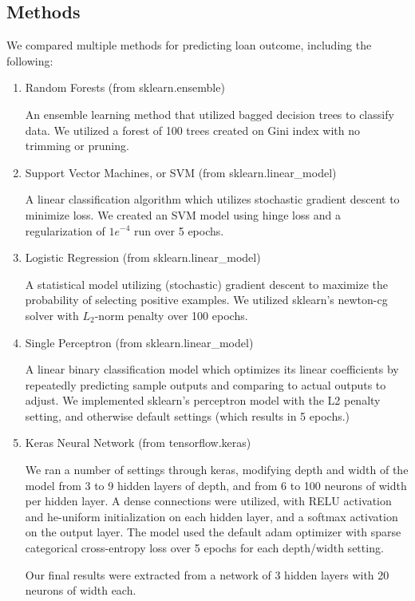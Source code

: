 \subsection{Methods}

We compared multiple methods for predicting loan outcome, including the following:

\begin{enumerate}
    \item Random Forests (from sklearn.ensemble)

        An ensemble learning method that utilized bagged decision trees to classify data. We utilized a forest of 100 trees created on Gini index with no trimming or pruning.
    
    \item Support Vector Machines, or SVM (from sklearn.linear\_model)

        A linear classification algorithm which utilizes stochastic gradient descent to minimize loss. We created an SVM model using hinge loss and a regularization of $1 e^{-4}$ run over 5 epochs.

    \item Logistic Regression (from sklearn.linear\_model)

        A statistical model utilizing (stochastic) gradient descent to maximize the probability of selecting positive examples. We utilized sklearn's newton-cg solver with $L_2$-norm penalty over 100 epochs.

    \item Single Perceptron (from sklearn.linear\_model)

        A linear binary classification model which optimizes its linear coefficients by repeatedly predicting sample outputs and comparing to actual outputs to adjust. We implemented sklearn's perceptron model with the L2 penalty setting, and otherwise default settings (which results in 5 epochs.)

    \item Keras Neural Network (from tensorflow.keras)

        We ran a number of settings through keras, modifying depth and width of the model from 3 to 9 hidden layers of depth, and from 6 to 100 neurons of width per hidden layer. A dense connections were utilized, with RELU activation and he-uniform initialization on each hidden layer, and a softmax activation on the output layer. The model used the default adam optimizer with sparse categorical cross-entropy loss over 5 epochs for each depth/width setting.

        Our final results were extracted from a network of 3 hidden layers with 20 neurons of width each.

\end{enumerate}
